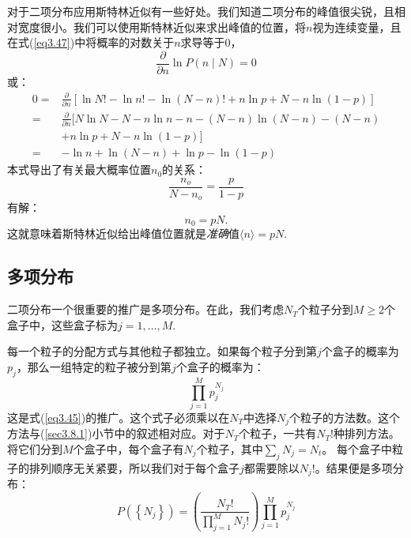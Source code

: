\documentclass[UTF8]{ctexart}
\numberwithin{equation}{section}%
\numberwithin{figure}{section}%
\begin{document}
    对于二项分布应用斯特林近似有一些好处。我们知道二项分布的峰值很尖锐，且相对宽度很小。我们可以使用斯特林近似来求出峰值的位置，将$n$视为连续变量，且在式(\ref{eq3.47})中将概率的对数关于$n$求导等于0，
    \begin{equation}
        \frac{\partial}{\partial n} \ln P(n \mid N)=0
    \end{equation}
    或：
    \begin{equation}
        \begin{aligned}
            0=& \frac{\partial}{\partial n}[\ln N !-\ln n !-\ln (N-n) !+n \ln p+N-n \ln (1-p)] \\
            =& \frac{\partial}{\partial n}[N \ln N-N-n \ln n-n-(N-n) \ln (N-n)-(N-n)\\
            &+n \ln p+N-n \ln (1-p)] \\
            =&-\ln n+\ln (N-n)+\ln p-\ln (1-p)
            \end{aligned}
    \end{equation}
    本式导出了有关最大概率位置$n_0$的关系：
    \begin{equation}
        \frac{n_{o}}{N-n_{o}}=\frac{p}{1-p}
    \end{equation}
    有解：
    \begin{equation}
        n_0=pN.
    \end{equation}
    这就意味着斯特林近似给出峰值位置就是\textit{准确}值$\langle{n}\rangle=pN$.
    \subsection{多项分布}\label{sec3.13}
    二项分布一个很重要的推广是多项分布。在此，我们考虑$N_T$个粒子分到$M\geq2$个盒子中，这些盒子标为$j=1,\ldots,M.$

    每一个粒子的分配方式与其他粒子都独立。如果每个粒子分到第$j$个盒子的概率为$p_j$，那么一组特定的粒子被分到第$j$个盒子的概率为：
    \begin{equation}
        \prod_{j=1}^{M} p_{j}^{N_{j}}
    \end{equation}
    这是式(\ref{eq3.45})的推广。这个式子必须乘以在$N_T$中选择$N_j$个粒子的方法数。这个方法与(\ref{sec3.8.1})小节中的叙述相对应。对于$N_T$个粒子，一共有$N_T!$种排列方法。将它们分到$M$个盒子中，每个盒子有$N_j$个粒子，其中$\sum_jN_j=N_t$。
    每个盒子中粒子的排列顺序无关紧要，所以我们对于每个盒子$j$都需要除以$N_j!$。结果便是多项分布：
    \begin{equation}\label{eq3.82}
        P\left(\left\{N_{j}\right\}\right)=\left(\frac{N_{T} !}{\prod_{j=1}^{M} N_{j} !}\right) \prod_{j=1}^{M} p_{j}^{N_{j}}
    \end{equation}
\end{document}
